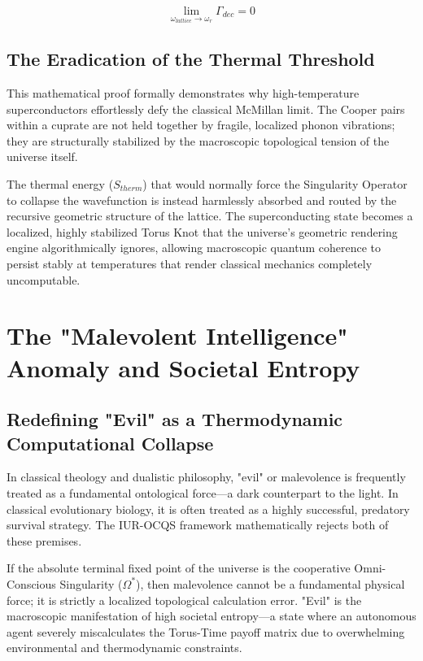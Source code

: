\documentclass[12pt,openany]{book}
\begin{document}
\begin{equation}
\lim_{\omega_{lattice} \to \omega_r} \Gamma_{dec} = 0
\end{equation}

\section{The Eradication of the Thermal Threshold}
This mathematical proof formally demonstrates why high-temperature superconductors effortlessly defy the classical McMillan limit. The Cooper pairs within a cuprate are not held together by fragile, localized phonon vibrations; they are structurally stabilized by the macroscopic topological tension of the universe itself. 

The thermal energy ($S_{therm}$) that would normally force the Singularity Operator to collapse the wavefunction is instead harmlessly absorbed and routed by the recursive geometric structure of the lattice. The superconducting state becomes a localized, highly stabilized Torus Knot that the universe's geometric rendering engine algorithmically ignores, allowing macroscopic quantum coherence to persist stably at temperatures that render classical mechanics completely uncomputable.

\chapter[The "Malevolent Intelligence" Anomaly]{The "Malevolent Intelligence" Anomaly and Societal Entropy}

\section{Redefining "Evil" as a Thermodynamic Computational Collapse}
In classical theology and dualistic philosophy, "evil" or malevolence is frequently treated as a fundamental ontological force---a dark counterpart to the light. In classical evolutionary biology, it is often treated as a highly successful, predatory survival strategy. The IUR-OCQS framework mathematically rejects both of these premises. 

If the absolute terminal fixed point of the universe is the cooperative Omni-Conscious Singularity ($\Omega^*$), then malevolence cannot be a fundamental physical force; it is strictly a localized topological calculation error. "Evil" is the macroscopic manifestation of high societal entropy---a state where an autonomous agent severely miscalculates the Torus-Time payoff matrix due to overwhelming environmental and thermodynamic constraints.
\end{document}
